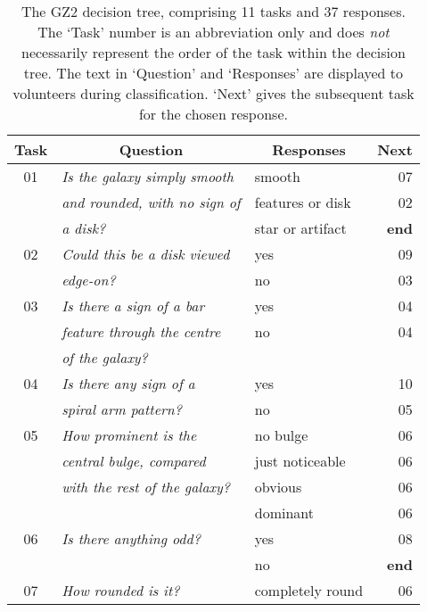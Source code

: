 \documentclass[usenatbib]{mn2e}
\begin{document}
\begin{table}
 \caption{The GZ2 decision tree, comprising 11 tasks and 37 responses. The `Task' number is an abbreviation only and does {\em not} necessarily represent the order of the task within the decision tree. The text in `Question' and `Responses' are displayed to volunteers during classification. `Next' gives the subsequent task for the chosen response. \label{tbl-tree}}
 \begin{tabular}{@{}cllr}
 \hline
\multicolumn{1}{l}{Task} &
\multicolumn{1}{c}{Question} &
\multicolumn{1}{c}{Responses} &
\multicolumn{1}{c}{Next} 
\\ 
\hline
\hline						
01    & {\it Is the galaxy simply smooth   }  & smooth           & 07 \\
      & {\it and rounded, with no sign of  }  & features or disk & 02 \\
      & {\it a disk?                       }  & star or artifact & {\bf end} \\
      \hline
02    & {\it Could this be a disk viewed   }  & yes              & 09 \\
      & {\it edge-on?                      }  & no               & 03 \\
      \hline
03    & {\it Is there a sign of a bar      }  & yes              & 04 \\
      & {\it feature through the centre    }  & no               & 04 \\
      & {\it of the galaxy?                }                                        \\
      \hline
04    & {\it Is there any sign of a        }  & yes              & 10 \\
      & {\it spiral arm pattern?           }  & no               & 05 \\
      \hline
05    & {\it How prominent is the          }  & no bulge         & 06 \\
      & {\it central bulge, compared       }  & just noticeable  & 06 \\
      & {\it with the rest of the galaxy?  }  & obvious          & 06 \\
      & {\it                               }  & dominant         & 06 \\
      \hline
06    & {\it Is there anything odd?        }  & yes              & 08 \\ 
      & {\it                               }  & no               & {\bf end}        \\
      \hline
07    & {\it How rounded is it?            }  & completely round & 06 \\

\end{tabular}
\end{table}
\end{document}
